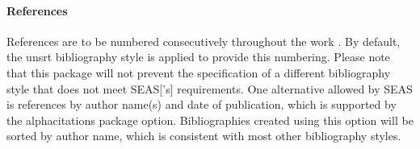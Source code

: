 \documentclass[10pt]{article}
\newcommand{\option}[1]{#1}
\begin{document}
\paragraph{References}
References are to be numbered consecutively throughout the work \cite{seas:instructions}.
By default, the unsrt bibliography style is applied to provide this numbering.
Please note that this package will not prevent the specification of a different bibliography style that does not meet \gls{SEAS}['s] requirements.
One alternative allowed by \gls{SEAS} is references by author name(s) and date of publication, which is supported by the \option{alphacitations} package option.
Bibliographies created using this option will be sorted by author name, which is consistent with most other bibliography styles.

\RaggedRight


\end{document}
